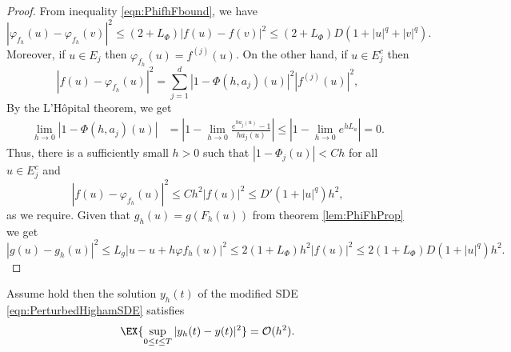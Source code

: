 \begin{proof}
	From inequality \eqref{eqn:PhifhFbound}, we have
	\begin{equation*}
		|\varphi_{f_h}(u) - \varphi_{f_h}(v)|^2
		\leq
			(2 + L_{\Phi}) |f(u) - f(v)|^2 
			\leq
				(2 + L_{\Phi}) D (1 + |u|^q +|v|^q). 
	\end{equation*}
	Moreover, if $u \in E_j$ then $\varphi_{f_h}(u) = f^{(j)}(u)$. On the other hand,  if $u\in E_j^c$ then
	$$
		|f(u) - \varphi_{f_h}(u)|^2
		=
		\sum_{j=1}^d
			|1-\Phi(h,a_j)(u)|^2 |f^{(j)}(u)|^2,	
	$$
	 By the L'H\^{o}pital 
	theorem, we get
	\begin{align*}
		\lim_{h \to 0} |1-\Phi(h,a_j)(u)| 
			&= \left|
				1-\lim_{h\to 0} \frac{e^{h a_j(u)}-1}{h a_j(u)}
			\right|			
			\leq 
				\left|
					1-\lim_{h\to 0} e^{h L_a}
				\right|=0.			
	\end{align*}
	Thus, there is a sufficiently small $h>0$  such that
	$|1-\Phi_j(u)|<C h$ for all $u\in E_j^c$ and
	$$
		|f(u) - \varphi_{f_h}(u)|^2
		\leq
		Ch^2 |f(u)|^2
		\leq D'(1+|u|^q)h^2,	
	$$
	as we require. Given that $g_h(u)=g(F_h(u))$ from 
	theorem \ref{lem:PhiFhProp} we get
	\begin{equation*}
		|g(u) - g_h(u)|^2 
		\leq
			L_g |u - u +h \varphi{f_h}(u)|^2 
		\leq 
			2(1+L_{\Phi})h^2 |f(u)|^2
		\leq
			2(1+L_{\Phi}) D(1+|u|^q) h^2. 
	\end{equation*}
\end{proof}
%
\begin{lem}\label{lem:yhyOh}
	Assume  hold then the solution $y_h(t)$ of 
	the modified SDE \eqref{eqn:PerturbedHighamSDE}
	satisfies
	\begin{equation}
		\EX{
			\sup_{0\leq t \leq T}
			|y_h(t) - y(t)|^2	
		} = \mathcal{O}(h^2).
	\end{equation}	
\end{lem}
